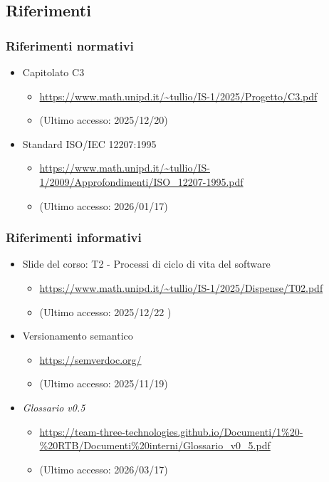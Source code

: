\documentclass[a4paper,12pt]{article}
\begin{document}
    \subsection{Riferimenti}
        \subsubsection{Riferimenti normativi}
            \begin{itemize}
                \item Capitolato C3
                \begin{itemize}
                    \item {\url{https://www.math.unipd.it/~tullio/IS-1/2025/Progetto/C3.pdf}}
                    \item[] (Ultimo accesso: 2025/12/20)
                \end{itemize}
                \item Standard ISO/IEC 12207:1995
                \begin{itemize}
                    \item \url{https://www.math.unipd.it/~tullio/IS-1/2009/Approfondimenti/ISO_12207-1995.pdf}
                    \item[] (Ultimo accesso: 2026/01/17)
                \end{itemize}
            \end{itemize}

        \subsubsection{Riferimenti informativi}
            \label{sec:refinf}
            \begin{itemize}
                \item Slide del corso: T2 - Processi di ciclo di vita del software
                \begin{itemize}
                    \item \url{https://www.math.unipd.it/~tullio/IS-1/2025/Dispense/T02.pdf} 
                    \item[] (Ultimo accesso: 2025/12/22 )
                \end{itemize}
                \item Versionamento semantico
                \begin{itemize}
                    \item \url{https://semverdoc.org/}
                    \item[] (Ultimo accesso: 2025/11/19)
                \end{itemize}
                \item \textit{Glossario v0.5}
                \begin{itemize}
                    \item \url{https://team-three-technologies.github.io/Documenti/1%20-%20RTB/Documenti%20interni/Glossario_v0_5.pdf}
                    \item[] (Ultimo accesso: 2026/03/17)
                \end{itemize}
            \end{itemize}
            
\end{document}
